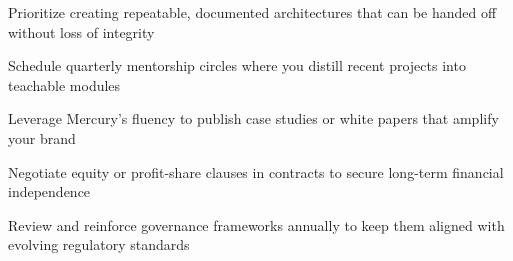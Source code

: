 \begin{diamondlist}
  \item {\fontsize{8.5}{12}\selectfont Prioritize creating repeatable, documented architectures that can be handed off without loss of integrity}
  \item {\fontsize{8.5}{12}\selectfont Schedule quarterly mentorship circles where you distill recent projects into teachable modules}
  \item {\fontsize{8.5}{12}\selectfont Leverage Mercury's fluency to publish case studies or white papers that amplify your brand}
  \item {\fontsize{8.5}{12}\selectfont Negotiate equity or profit-share clauses in contracts to secure long-term financial independence}
  \item {\fontsize{8.5}{12}\selectfont Review and reinforce governance frameworks annually to keep them aligned with evolving regulatory standards}
\end{diamondlist}


